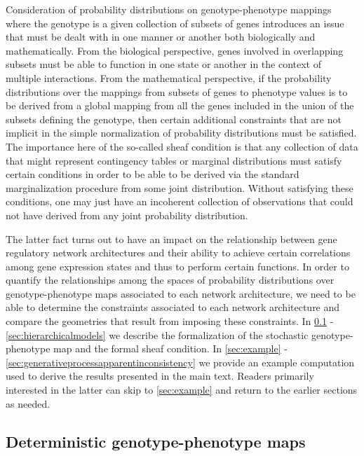 Consideration of probability distributions on genotype-phenotype mappings where the genotype is a given collection of subsets of genes introduces an issue that must be dealt with in one manner or another both biologically and mathematically. From the biological perspective, genes involved in overlapping subsets must be able to function in one state or another in the context of multiple interactions. From the mathematical perspective, if the probability distributions over the mappings from subsets of genes to phenotype values is to be derived from a global mapping from all the genes included in the union of the subsets defining the genotype, then certain additional constraints that are not implicit in the simple normalization of probability distributions must be satisfied. The importance here of the so-called sheaf condition is that any collection of data that might represent contingency tables or marginal distributions must satisfy certain conditions in order to be able to be derived via the standard marginalization procedure from some joint distribution. Without satisfying these conditions, one may just have an incoherent collection of observations that could not have derived from any joint probability distribution.

The latter fact turns out to have an impact on the relationship between gene regulatory network architectures and their ability to achieve certain correlations among gene expression states and thus to perform certain functions. In order to quantify the relationships among the spaces of probability distributions over genotype-phenotype maps associated to each network architecture, we need to be able to determine the constraints associated to each network architecture and compare the geometries that result from imposing these constraints. In \ref{sec:dgpm} - \ref{sec:hierarchicalmodels} we describe the formalization of the stochastic genotype-phenotype map and the formal sheaf condition. In \ref{sec:example} - \ref{sec:generativeprocessapparentinconsistency} we provide an example computation used to derive the results presented in the main text. Readers primarily interested in the latter can skip to \ref{sec:example} and return to the earlier sections as needed.

\subsection{Deterministic genotype-phenotype maps}\label{sec:dgpm}

